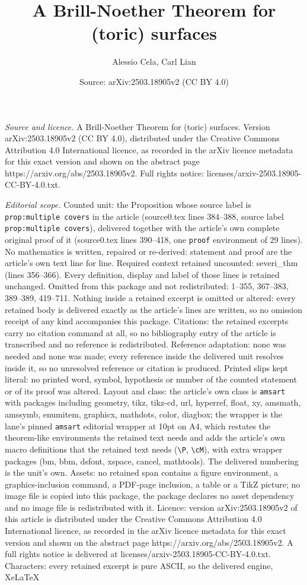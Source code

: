 \documentclass[10pt,a4paper]{amsart}
\title[A Brill-Noether Theorem for (toric) surfaces]{A Brill-Noether Theorem for (toric) surfaces}
\author{Alessio Cela, Carl Lian}
\date{Source: arXiv:2503.18905v2 (CC BY 4.0)}
\begin{document}
\maketitle

\noindent\emph{Source and licence.} A Brill-Noether Theorem for (toric) surfaces. Version arXiv:2503.18905v2 (CC BY 4.0), distributed under the Creative Commons Attribution 4.0 International licence, as recorded in the arXiv licence metadata for this exact version and shown on the abstract page https://arxiv.org/abs/2503.18905v2. Full rights notice: licenses/arxiv-2503.18905-CC-BY-4.0.txt.\par\smallskip

\noindent\textit{Editorial scope.} Counted unit: the Proposition whose source label is \texttt{prop:multiple covers} in the article (source0.tex lines 384--388, source label \texttt{prop:multiple covers}), delivered together with the article's own complete original proof of it (source0.tex lines 390--418, one \texttt{proof} environment of 29 lines). No mathematics is written, repaired or re-derived: statement and proof are the article's own text line for line. Required context retained uncounted: severi\_thm (lines 356--366). Every definition, display and label of those lines is retained unchanged. Omitted from this package and not redistributed: 1--355, 367--383, 389--389, 419--711. Nothing inside a retained excerpt is omitted or altered: every retained body is delivered exactly as the article's lines are written, so no omission receipt of any kind accompanies this package. Citations: the retained excerpts carry no citation command at all, so no bibliography entry of the article is transcribed and no reference is redistributed. Reference adaptation: none was needed and none was made; every reference inside the delivered unit resolves inside it, so no unresolved reference or citation is produced. Printed slips kept literal: no printed word, symbol, hypothesis or number of the counted statement or of its proof was altered. Layout and class: the article's own class is \texttt{amsart} with packages including geometry, tikz, tikz-cd, url, hyperref, float, xy, amsmath, amssymb, enumitem, graphicx, mathdots, color, diagbox; the wrapper is the lane's pinned \texttt{amsart} editorial wrapper at 10pt on A4, which restates the theorem-like environments the retained text needs and adds the article's own macro definitions that the retained text needs (\texttt{\textbackslash P}, \texttt{\textbackslash cM}), with extra wrapper packages (bm, bbm, dsfont, xspace, cancel, mathtools). The delivered numbering is the unit's own. Assets: no retained span contains a figure environment, a graphics-inclusion command, a PDF-page inclusion, a table or a TikZ picture; no image file is copied into this package, the package declares no asset dependency and no image file is redistributed with it. Licence: version arXiv:2503.18905v2 of this article is distributed under the Creative Commons Attribution 4.0 International licence, as recorded in the arXiv licence metadata for this exact version and shown on the abstract page https://arxiv.org/abs/2503.18905v2. A full rights notice is delivered at licenses/arxiv-2503.18905-CC-BY-4.0.txt. Characters: every retained excerpt is pure ASCII, so the delivered engine, XeLaTeX 
\end{document}
